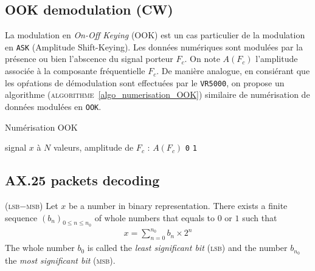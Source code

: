 \documentclass[twocolumn,pre,floats,aps,amsmath,amssymb]{revtex4}
\newenvironment{definition}[1][D\'efinition.]{\begin{trivlist}
\item[\hskip \labelsep {\bfseries #1}]}{\end{trivlist}}
\begin{document}
\subsection{OOK demodulation (CW)}

La modulation en \textit{On-Off Keying} (OOK) est un cas particulier de la modulation en \texttt{ASK} (Amplitude Shift-Keying). Les donn\'ees num\'eriques sont modul\'ees par la pr\'esence ou bien l'abscence du signal porteur $F_c$. On note $A(F_c)$ l'amplitude associ\'ee \`a la composante fr\'equentielle $F_c$. De mani\`ere analogue, en consi\'erant que les op\'rations de d\'emodulation sont effectu\'ees par le \texttt{VR5000}, on propose un algorithme (\textsc{algorithme}~\ref{algo_numerisation_OOK}) similaire de num\'erisation de donn\'ees modul\'ees en \texttt{OOK}.

\begin{algorithm}[h]
\caption{Num\'erisation OOK}
\label{algo_numerisation_OOK}
\begin{algorithmic}[1]
  \REQUIRE signal $x$ \`a $N$ valeurs, amplitude de $F_c$ : $A(F_c)$
  \RETURN \texttt{0}
  \ELSE
  \RETURN \texttt{1}
  \ENDIF
\end{algorithmic}
\end{algorithm}

\subsection{AX.25 packets decoding}

\begin{definition}
  { \color{rltred}{\Radioactivity} }
  \textsc{(lsb$-$msb)}
  Let $x$ be a number in binary representation. There exists a finite sequence $\left ( b_n \right )_{0 \leq n \leq n_0}$ of whole numbers that equals to $0$ or $1$ such that 
  \begin{eqnarray*}
    x = \sum^{n_0}_{n = 0}{b_n \times 2^n}
  \end{eqnarray*}
  The whole number $b_0$ is called the \textit{least significant bit} (\textsc{lsb}) and the number $b_{n_0}$ the \textit{most significant bit} (\textsc{msb}).
\end{definition}
\end{document}
